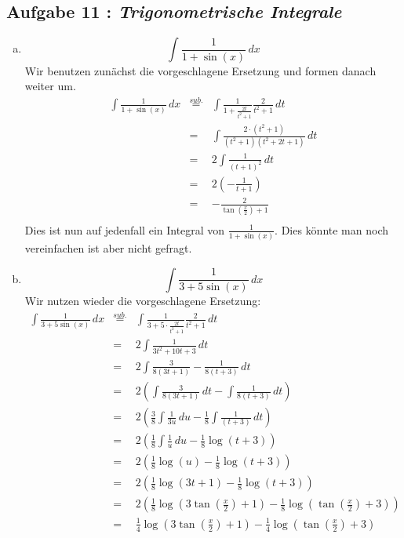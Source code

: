 \documentclass[11pt,a4paper,ngerman]{article}
\begin{document}
\subsection*{Aufgabe 11 : \mdseries\itshape Trigonometrische Integrale}

\begin{enumerate}[a.]
    \addtocounter{enumi}{6}
    \item
        $$
            \int \frac{1}{1+\sin (x)} \, dx
        $$
        Wir benutzen zunächst die vorgeschlagene Ersetzung und formen danach weiter um.
        $$\begin{array}{rcl}
            \int \frac{1}{1+\sin(x)} \, dx
                &\stackrel{sub.}{=}& \int \frac{1}{1+\frac{2t}{t^2 + 1}} \frac{2}{t^2 +1} \, dt\\
                &=& \int \frac{2\cdot (t^2 + 1)}{(t^2 + 1)(t^2 +2t + 1)} \, dt\\
                &=& 2 \int \frac{1}{(t+1)^2} \, dt\\
                &=& 2 (-\frac{1}{t+1})\\
                &=& -\frac{2}{\tan(\frac{x}{2}) + 1}\\
        \end{array}$$
        Dies ist nun auf jedenfall ein Integral von $\frac{1}{1+\sin(x)}$. Dies könnte man noch vereinfachen
        ist aber nicht gefragt. 
    \item
        $$
            \int \frac{1}{3 + 5 \sin (x)} \, dx
        $$
        Wir nutzen wieder die vorgeschlagene Ersetzung:
        \begin{eqnarray*}
        \int \frac{1}{3 + 5 \sin (x)} \, dx
        &\stackrel{sub.}{=}& \int \frac{1}{3 +5 \cdot \frac{2t}{t^2 + 1}} \frac{2}{t^2 +1}  \, dt\\
        &=& 2 \int \frac{1}{3t^2 + 10t + 3} \, dt \\
        &=& 2 \int \frac{3}{8(3t+1)} - \frac{1}{8(t+3)} \, dt \\
        &=& 2 \left( \int \frac{3}{8(3t+1)} \, dt - \int \frac{1}{8(t+3)} \, dt \right)\\
        &=& 2 \left( \frac{3}{8} \int \frac{1}{3u} \, du - \frac{1}{8} \int \frac{1}{(t+3)} \, dt \right)\\
        &=& 2 \left( \frac{1}{8} \int \frac{1}{u} \, du - \frac{1}{8} \log(t+3) \right)\\
        &=& 2 \left( \frac{1}{8} \log(u) - \frac{1}{8} \log(t+3) \right)\\
        &=& 2 \left( \frac{1}{8} \log(3t+1) - \frac{1}{8} \log(t+3) \right)\\
        &=& 2 \left( \frac{1}{8} \log(3 \tan(\frac{x}{2})+1) - \frac{1}{8} \log(\tan(\frac{x}{2})+3) \right)\\
        &=&\frac{1}{4} \log(3 \tan(\frac{x}{2})+1) - \frac{1}{4} \log(\tan(\frac{x}{2})+3) \\
        \end{eqnarray*}
        
\end{enumerate}


\label{LastPage}
\end{document}
